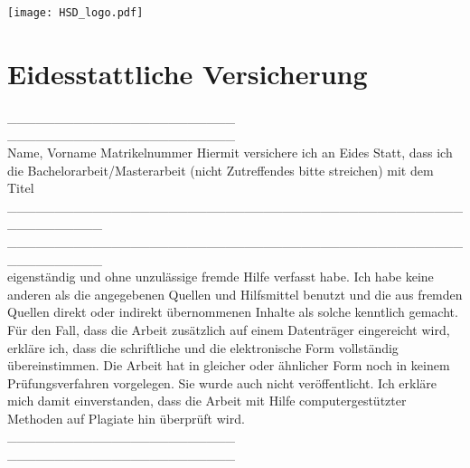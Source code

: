 
\newpage
\clearpairofpagestyles
\texttt{[image: HSD\_logo.pdf]}
\section*{Eidesstattliche Versicherung}
\_\_\_\_\_\_\_\_\_\_\_\_\_\_\_\_\_\_\_\_\_\_\_\_ \hspace{1.5cm} \_\_\_\_\_\_\_\_\_\_\_\_\_\_\_\_\_\_\_\_\_\_\_\_ \\
\small{Name, Vorname}\hspace{4.4cm}
\small{Matrikelnummer}
\newline
Hiermit versichere ich an Eides Statt, dass ich die Bachelorarbeit/Masterarbeit (nicht Zutreffendes bitte streichen) mit dem Titel \newline
\_\_\_\_\_\_\_\_\_\_\_\_\_\_\_\_\_\_\_\_\_\_\_\_\_\_\_\_\_\_\_\_\_\_\_\_\_\_\_\_\_\_\_\_\_\_\_\_\_\_\_\_\_\_\_\_\_\_ \\
\_\_\_\_\_\_\_\_\_\_\_\_\_\_\_\_\_\_\_\_\_\_\_\_\_\_\_\_\_\_\_\_\_\_\_\_\_\_\_\_\_\_\_\_\_\_\_\_\_\_\_\_\_\_\_\_\_\_ \\
eigenständig und ohne unzulässige fremde Hilfe verfasst habe. Ich habe keine anderen als die angegebenen Quellen und Hilfsmittel benutzt und die aus fremden Quellen direkt oder indirekt übernommenen Inhalte als solche kenntlich gemacht. Für den Fall, dass die Arbeit zusätzlich auf einem Datenträger eingereicht wird, erkläre ich, dass die schriftliche und die elektronische Form vollständig übereinstimmen. Die Arbeit hat in gleicher oder ähnlicher Form noch in keinem Prüfungsverfahren vorgelegen.
Sie wurde auch nicht veröffentlicht. Ich erkläre mich damit einverstanden, dass die Arbeit mit Hilfe computergestützter Methoden auf Plagiate hin überprüft wird.\newline
\_\_\_\_\_\_\_\_\_\_\_\_\_\_\_\_\_\_\_\_\_\_\_\_ \hspace{1.5cm} \_\_\_\_\_\_\_\_\_\_\_\_\_\_\_\_\_\_\_\_\_\_\_\_ \\
